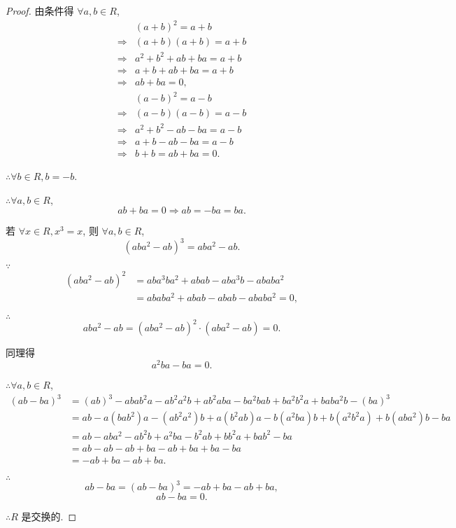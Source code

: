 \documentclass[color=black,device=normal,lang=cn,mode=geye]{elegantnote}
\begin{document}
\begin{proof}
    由条件得 $\forall a,b\in R$,
    \begin{align*}
        & (a+b)^2=a+b \\
        \Rightarrow & (a+b)(a+b)=a+b \\
        \Rightarrow & a^2+b^2+ab+ba=a+b \\
        \Rightarrow & a+b+ab+ba=a+b \\
        \Rightarrow & ab+ba=0,
    \end{align*}
    \begin{align*}
        & (a-b)^2=a-b \\
        \Rightarrow & (a-b)(a-b)=a-b \\
        \Rightarrow & a^2+b^2-ab-ba=a-b \\
        \Rightarrow & a+b-ab-ba=a-b \\
        \Rightarrow & b+b=ab+ba=0.
    \end{align*}

    $\therefore\forall b\in R,b=-b$.

    $\therefore\forall a,b\in R$,
    \[ab+ba=0\Rightarrow ab=-ba=ba.\]

    若 $\forall x\in R,x^3=x$, 则 $\forall a,b\in R$,
    \[(aba^2-ab)^3=aba^2-ab.\]

    $\because$
    \begin{align*}
        (aba^2-ab)^2 & =aba^3ba^2+abab-aba^3b-ababa^2 \\
        & =ababa^2+abab-abab-ababa^2=0,
    \end{align*}

    $\therefore$
    \[aba^2-ab=(aba^2-ab)^2\cdot(aba^2-ab)=0.\]

    同理得
    \[a^2ba-ba=0.\]

    $\therefore\forall a,b\in R$,
    \begin{align*}
        (ab-ba)^3 & =(ab)^3-abab^2a-ab^2a^2b+ab^2aba-ba^2bab+ba^2b^2a+baba^2b-(ba)^3 \\
        & =ab-a(bab^2)a-(ab^2a^2)b+a(b^2ab)a-b(a^2ba)b+b(a^2b^2a)+b(aba^2)b-ba \\
        & =ab-aba^2-ab^2b+a^2ba-b^2ab+bb^2a+bab^2-ba \\
        & =ab-ab-ab+ba-ab+ba+ba-ba \\
        & =-ab+ba-ab+ba.
    \end{align*}

    $\therefore$
    \[ab-ba=(ab-ba)^3=-ab+ba-ab+ba,\]
    \[ab-ba=0.\]

    $\therefore R$ 是交换的.
\end{proof}
\end{document}
